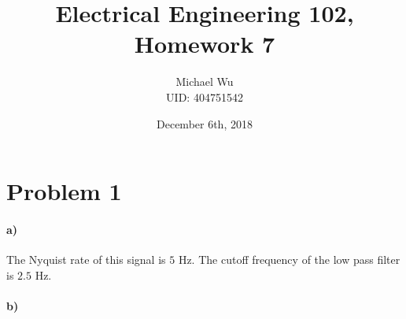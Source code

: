 \documentclass[12pt]{article}
\begin{document}
\title{Electrical Engineering 102, Homework 7}
\date{December 6th, 2018}
\author{Michael Wu\\UID: 404751542}
\maketitle

\section*{Problem 1}

\paragraph{a)}

The Nyquist rate of this signal is \(5\) Hz. The cutoff frequency of the low pass filter is \(2.5\) Hz.

\paragraph{b)}
\end{document}
